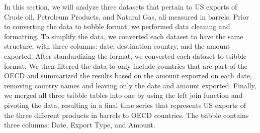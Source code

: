 \documentclass[
]{article}
\begin{document}
In this section, we will analyze three datasets that pertain to US
exports of Crude oil, Petroleum Products, and Natural Gas, all measured
in barrels. Prior to converting the data to tsibble format, we performed
data cleaning and formatting. To simplify the data, we converted each
dataset to have the same structure, with three columns: date,
destination country, and the amount exported. After standardizing the
format, we converted each dataset to tsibble format. We then filtered
the data to only include countries that are part of the OECD and
summarized the results based on the amount exported on each date,
removing country names and leaving only the date and amount exported.
Finally, we merged all three tsibble tables into one by using the left
join function and pivoting the data, resulting in a final time series
that represents US exports of the three different products in barrels to
OECD countries. The tsibble contains three columns: Date, Export Type,
and Amount.
\end{document}
